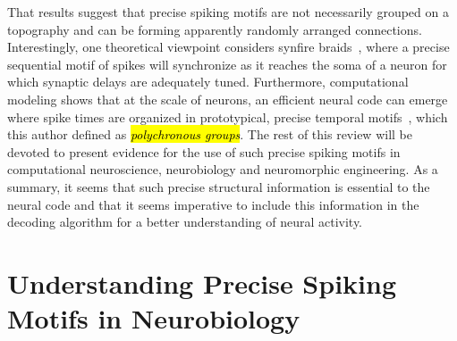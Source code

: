 \documentclass[brainsci, %
               review,accept,pdftex,moreauthors
               ]{Definitions/mdpi}
\begin{document}
That results suggest that precise spiking motifs are not necessarily grouped on a topography and can be forming apparently randomly arranged connections. Interestingly, one theoretical viewpoint considers synfire braids~\citep{bienenstock_model_1995}, where a precise sequential motif of spikes will synchronize as it reaches the soma of a neuron for which synaptic delays are adequately tuned. Furthermore, computational modeling shows that at the scale of neurons, an efficient neural code can emerge where spike times are organized in prototypical, precise temporal motifs~\citep{izhikevich_polychronization_2006}, which this author defined as \emph{\hl{polychronous groups}}. The rest of this review will be devoted to present evidence for the use of such precise spiking motifs in computational neuroscience, neurobiology and neuromorphic engineering. As a summary, it seems that such precise structural information is essential to the neural code and that it seems imperative to include this information in the decoding algorithm for a better understanding of neural activity.
%
\section{Understanding Precise Spiking Motifs in Neurobiology}\label{sec:detection}
\end{document}
